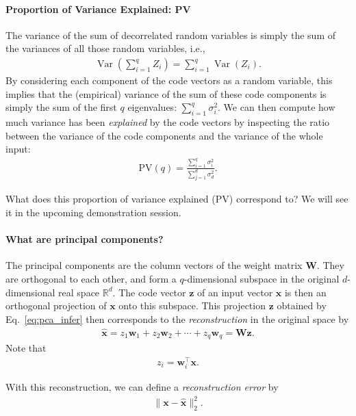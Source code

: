\documentclass{report}
\newcommand{\vect}[1]{\mathbf{#1}}
\newcommand{\matr}[1]{\mathbf{#1}}
\newcommand{\var}[0]{\operatorname{Var}}
\newcommand{\vx}[0]{\vect{x}}
\newcommand{\vz}[0]{\vect{z}}
\newcommand{\vw}[0]{\vect{w}}
\newcommand{\mW}[0]{\matr{W}}
\newcommand{\RR}[0]{\mathbb{R}}
\begin{document}
\paragraph{Proportion of Variance Explained: PV}

The variance of the sum of decorrelated random variables is simply the sum of
the variances of all those random variables, i.e.,
\begin{align*}
    \var(\sum_{i=1}^q Z_i) = \sum_{i=1}^q \var(Z_i).
\end{align*}
By considering each component of the code vectors as a random variable, this
implies that the (empirical) variance of the sum of these code components is
simply the sum of the first $q$ eigenvalues: $\sum_{i=1}^q \sigma_i^2$. We can
then compute how much variance has been {\it explained} by the code vectors by
inspecting the ratio between the variance of the code components and the
variance of the whole input:
\begin{align*}
    \text{PV}(q) = \frac{
        \sum_{i=1}^q \sigma_i^2
    }{
        \sum_{j=1}^d \sigma_d^2
    }.
\end{align*}

What does this proportion of variance explained (PV) correspond to? We will see
it in the upcoming demonstration session.

\paragraph{What are principal components?}

The principal components are the column vectors of the weight matrix $\mW$.
They are orthogonal to each other, and form a $q$-dimensional subspace in the
original $d$-dimensional real space $\RR^d$. The code vector $\vz$ of an input
vector $\vx$ is then an orthogonal projection of $\vx$ onto this subspace. This
projection $\vz$ obtained by Eq.~\eqref{eq:pca_infer} then corresponds to the
{\it reconstruction} in the original space by
\begin{align}
    \label{eq:pca_recon}
    \hat{\vx} = z_1 \vw_1 + z_2 \vw_2 + \cdots + z_q \vw_q = \mW \vz.
\end{align}
Note that
\begin{align*}
    z_i = \vw_i^\top \vx.
\end{align*}

With this reconstruction, we can define a {\it reconstruction error} by
\begin{align*}
    \| \vx - \hat{\vx} \|^2_2.
\end{align*}
\end{document}
